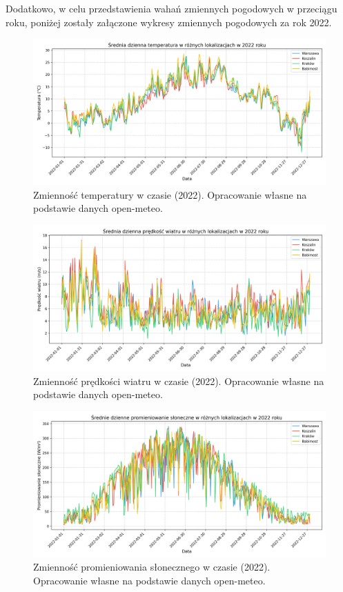 Dodatkowo, w celu przedstawienia wahań zmiennych pogodowych w przeciągu roku, poniżej zostały załączone wykresy zmiennych pogodowych za rok 2022.
\begin{figure}[H]
    \centering
    \includegraphics[width=\textwidth]{../plots/weather/temp_time_series_2022.png}
    \caption{Zmienność temperatury w czasie (2022). Opracowanie własne na podstawie danych open-meteo.}
    \label{fig:temp-time-series-2022}
\end{figure}

\begin{figure}[H]
    \centering
    \includegraphics[width=\textwidth]{../plots/weather/wind_speed_time_series_2022.png}
    \caption{Zmienność prędkości wiatru w czasie (2022). Opracowanie własne na podstawie danych open-meteo.}
    \label{fig:wind-speed-time-series-2022}
\end{figure}

\begin{figure}[H]
    \centering
    \includegraphics[width=\textwidth]{../plots/weather/solar_radiation_time_series_2022.png}
    \caption{Zmienność promieniowania słonecznego w czasie (2022). Opracowanie własne na podstawie danych open-meteo.}
    \label{fig:solar-radiation-time-series-2022}
\end{figure}

